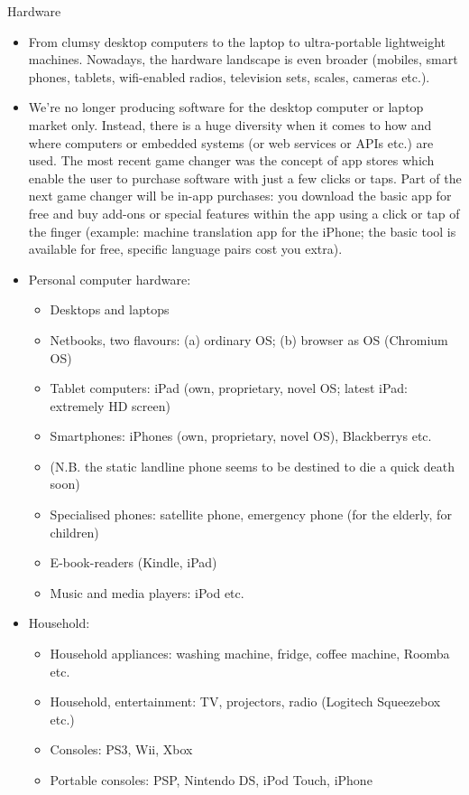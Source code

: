 \begin{multicols}{2}
Hardware

\begin{itemize}
\item From clumsy desktop computers to the laptop to ultra-portable lightweight machines. Nowadays, the hardware landscape is even broader (mobiles, smart phones, tablets, wifi-enabled radios, television sets, scales, cameras etc.).
\item We’re no longer producing software for the desktop computer or laptop market only. Instead, there is a huge diversity when it comes to how and where computers or embedded systems (or web services or APIs etc.) are used. The most recent game changer was the concept of app stores which enable the user to purchase software with just a few clicks or taps. Part of the next game changer will be in-app purchases: you download the basic app for free and buy add-ons or special features within the app using a click or tap of the finger (example: machine translation app for the iPhone; the basic tool is available for free, specific language pairs cost you extra).
\item Personal computer hardware: 
  \begin{itemize}
  \item Desktops and laptops
  \item Netbooks, two flavours: (a) ordinary OS; (b) browser as OS (Chromium OS)
  \item Tablet computers: iPad (own, proprietary, novel OS; latest iPad: extremely HD screen)
  \item Smartphones: iPhones (own, proprietary, novel OS), Blackberrys etc.
  \item (N.B. the static landline phone seems to be destined to die a quick death soon)
  \item Specialised phones: satellite phone, emergency phone (for the elderly, for children)
  \item E-book-readers (Kindle, iPad)
  \item Music and media players: iPod etc.
  \end{itemize}
\item Household:
  \begin{itemize}
  \item Household appliances: washing machine, fridge, coffee machine, Roomba etc.
  \item Household, entertainment: TV, projectors, radio (Logitech Squeezebox etc.)
  \item Consoles: PS3, Wii, Xbox
  \item Portable consoles: PSP, Nintendo DS, iPod Touch, iPhone

\end{itemize}
\end{itemize}
\end{multicols}
